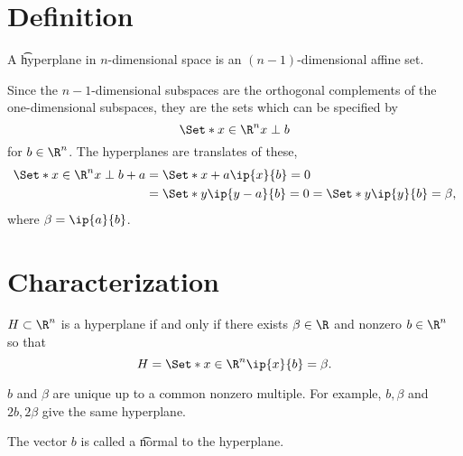 
\section*{Definition}

A \t{hyperplane} in $n$-dimensional space is an $(n-1)$-dimensional affine set.

Since the $n-1$-dimensional subspaces are the orthogonal complements of the one-dimensional subspaces, they are the sets which can be specified by
  \[
\Set*{x \in \R ^n}{x \perp b}
  \]
for $b \in \R ^n$.
The hyperplanes are translates of these,
  \[
\begin{aligned}
\Set*{x \in \R ^n}{x \perp b} + a &= \Set*{x + a}{\ip{x}{b} = 0} \\
&= \Set*{y}{\ip{y - a}{b} = 0} = \Set*{y}{\ip{y}{b} = \beta }, \\
\end{aligned}
  \]
where $\beta  = \ip{a}{b}$.

\section*{Characterization}

\begin{prop}
$H \subset \R ^n$ is a hyperplane if and only if there exists $\beta  \in \R $ and nonzero $b \in \R ^n$ so that
$$
H = \Set*{x \in \R ^n}{\ip{x}{b} = \beta }.
$$
\end{prop}
\begin{remark}
$b$ and $\beta $ are unique up to a common nonzero multiple.
For example, $b, \beta $ and $2b, 2\beta $ give the same hyperplane.
\end{remark}
\begin{remark}
The vector $b$ is called a \t{normal} to the hyperplane.
\end{remark}

\blankpage